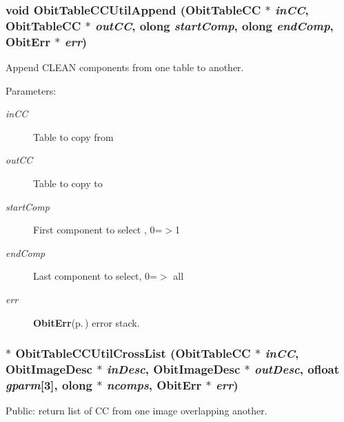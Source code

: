 \subsubsection{\setlength{\rightskip}{0pt plus 5cm}void Obit\-Table\-CCUtil\-Append ({\bf Obit\-Table\-CC} $\ast$ {\em in\-CC}, {\bf Obit\-Table\-CC} $\ast$ {\em out\-CC}, {\bf olong} {\em start\-Comp}, {\bf olong} {\em end\-Comp}, {\bf Obit\-Err} $\ast$ {\em err})}\label{ObitTableCCUtil_8c_a12}


Append CLEAN components from one table to another. 

\begin{Desc}
\item[Parameters:]
\begin{description}
\item[{\em in\-CC}]Table to copy from \item[{\em out\-CC}]Table to copy to \item[{\em start\-Comp}]First component to select , 0=$>$1 \item[{\em end\-Comp}]Last component to select, 0=$>$ all \item[{\em err}]{\bf Obit\-Err}{\rm (p.\,\pageref{structObitErr})} error stack. \end{description}
\end{Desc}
\subsubsection{$\ast$ Obit\-Table\-CCUtil\-Cross\-List ({\bf Obit\-Table\-CC} $\ast$ {\em in\-CC}, {\bf Obit\-Image\-Desc} $\ast$ {\em in\-Desc}, {\bf Obit\-Image\-Desc} $\ast$ {\em out\-Desc}, {\bf ofloat} {\em gparm}[3], {\bf olong} $\ast$ {\em ncomps}, {\bf Obit\-Err} $\ast$ {\em err})}\label{ObitTableCCUtil_8c_a7}


Public: return list of CC from one image overlapping another. 

